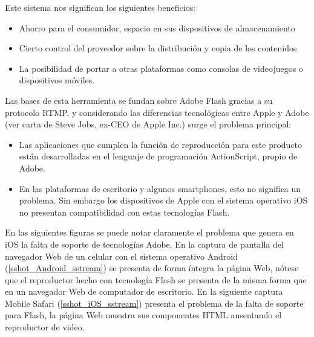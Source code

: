 Este sistema nos significan los siguientes beneficios: 
\begin{itemize}
\item Ahorro para el consumidor, espacio en sus dispositivos de almacenamiento
\item Cierto control del proveedor sobre la distribución  y copia de los contenidos
\item La posibilidad de portar a otras plataformas como consolas de videojuegos o dispositivos móviles.
\end{itemize}

Las bases de esta herramienta se fundan sobre Adobe Flash gracias a su protocolo RTMP, y considerando las diferencias tecnológicas entre Apple y Adobe (ver \cite{sota:steve-flash} carta de Steve Jobs, ex-CEO de Apple Inc.) surge el problema principal:

\begin{itemize}
\item Las aplicaciones que cumplen la función de reproducción para este producto están desarrolladas en el lenguaje de programación ActionScript, propio de Adobe.
\item En las plataformas de escritorio y algunos smartphones, esto no significa un problema. Sin embargo los dispositivos de Apple con el sistema operativo iOS no presentan compatibilidad con estas tecnologías Flash.
\end{itemize}

	En las siguientes figuras se puede notar claramente el problema que genera en iOS la falta de soporte de tecnologías Adobe. 
	En la captura de pantalla del navegador Web de un celular con el sistema operativo Android (\ref{sshot_Android_sstream}) se presenta de forma íntegra la página Web, nótese que el reproductor hecho con tecnología Flash se presenta de la misma forma que en un navegador Web de computador de escritorio. 
	En la siguiente captura Mobile Safari (\ref{sshot_iOS_sstream}) presenta el problema de la falta de soporte para Flash, la página Web muestra sus componentes HTML ausentando el reproductor de video.

